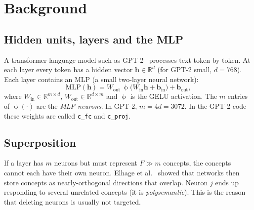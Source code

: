 \documentclass[11pt,a4paper]{article}
\theoremstyle{definition}
\begin{document}
\section{Background}
\label{sec:background}

\subsection{Hidden units, layers and the MLP}
A transformer language model such as GPT-2~\cite{radford2019gpt2} processes text token by token.
At each layer every token has a hidden vector $\mathbf h\in\mathbb R^{d}$ (for GPT-2 small,
$d=768$). Each layer contains an MLP (a small two-layer neural network):
\begin{equation}
  \mathrm{MLP}(\mathbf h)=W_{\mathrm{out}}\,\upphi\!\big(W_{\mathrm{in}}\mathbf h+\mathbf b_{\mathrm{in}}\big)+\mathbf b_{\mathrm{out}},
\end{equation}
where $W_{\mathrm{in}}\in\mathbb R^{m\times d}$, $W_{\mathrm{out}}\in\mathbb R^{d\times m}$ and
$\upphi$ is the GELU activation. The $m$ entries of $\upphi(\cdot)$ are the \emph{MLP neurons}. In GPT-2,
$m=4d=3072$. In the GPT-2 code these weights are called \texttt{c\_fc} and \texttt{c\_proj}.

\subsection{Superposition}
If a layer has $m$ neurons but must represent $F\gg m$ concepts, the concepts cannot each have
their own neuron. Elhage et al.~\cite{elhage2022toy} showed that networks then store concepts as
nearly-orthogonal directions that overlap. Neuron $j$ ends up responding to several unrelated
concepts (it is \emph{polysemantic}). This is the reason that deleting neurons is usually not
targeted.
\end{document}

